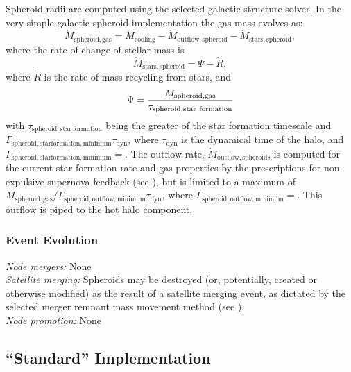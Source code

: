 Spheroid radii are computed using the selected galactic structure solver. In the very simple galactic spheroid implementation the gas mass evolves as:
\begin{equation}
 \dot{M}_\mathrm{spheroid, gas} = \dot{M}_\mathrm{cooling} - \dot{M}_\mathrm{outflow, spheroid} - \dot{M}_\mathrm{stars, spheroid},
\end{equation}
where the rate of change of stellar mass is
\begin{equation}
 \dot{M}_\mathrm{stars, spheroid} = \Psi - \dot{R},
\end{equation}
where $\dot{R}$ is the rate of mass recycling from stars, and
\begin{equation}
 \Psi = {M_\mathrm{spheroid, gas} \over \tau_\mathrm{spheroid, star~formation}}
\end{equation}
with $\tau_\mathrm{spheroid, star~formation}$ being the greater of the star formation timescale and $\Gamma_\mathrm{spheroid, star formation, minimum} \tau_\mathrm{dyn}$, where $\tau_\mathrm{dyn}$ is the dynamical time of the halo, and $\Gamma_\mathrm{spheroid, star formation, minimum}=${\normalfont \ttfamily [spheroidStarFormationTimescaleMinimum]}. The outflow rate, $\dot{M}_\mathrm{outflow, spheroid}$, is computed for the current star formation rate and gas properties by the prescriptions for non-expulsive supernova feedback (see ), but is limited to a maximum of $M_\mathrm{spheroid, gas}/ \Gamma_\mathrm{spheroid, outflow, minimum} \tau_\mathrm{dyn}$, where $\Gamma_\mathrm{spheroid, outflow, minimum}=${\normalfont \ttfamily [spheroidOutflowTimescaleMinimum]}. This outflow is piped to the hot halo component.

\subsubsection{Event Evolution}

\noindent\emph{Node mergers:} None\\

\noindent\emph{Satellite merging:} Spheroids may be destroyed (or, potentially, created or otherwise modified) as the result of a satellite merging event, as dictated by the selected merger remnant mass movement method (see ).\\

\noindent\emph{Node promotion:} None\\

\subsection{``Standard'' Implementation}

